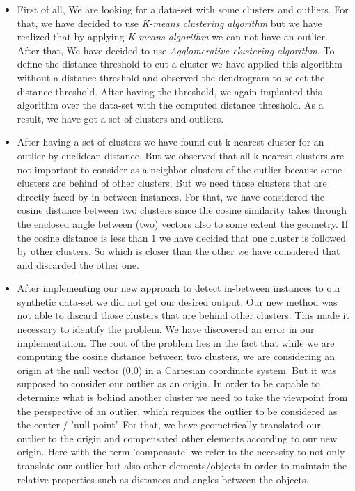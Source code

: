\documentclass[11pt]{article}
\theoremstyle{definition}
\begin{document}
\begin{itemize}
    \item First of all, We are looking for a data-set with some clusters and outliers. For that, we have decided to use \textit{K-means clustering algorithm} but we have realized that by applying \textit{K-means algorithm} we can not have an outlier. After that, We have decided to use \textit{Agglomerative clustering algorithm}. To define the distance threshold to cut a cluster we have applied this algorithm without a distance threshold and observed the dendrogram to select the distance threshold. After having the threshold, we again implanted this algorithm over the data-set with the computed distance threshold. As a result, we have got a set of clusters and outliers.
    
    \item After having a set of clusters we have found out k-nearest cluster for an outlier by euclidean distance. But we observed that all k-nearest clusters are not important to consider as a neighbor clusters of the outlier because some clusters are behind of other clusters. But we need those clusters that are directly faced by in-between instances. For that, we have considered the cosine distance between two clusters since the cosine similarity takes through the enclosed angle between (two) vectors also to some extent the geometry. If the cosine distance is less than 1 we have decided that one cluster is followed by other clusters. So which is closer than the other we have considered that and discarded the other one.

    \item After implementing our new approach to detect in-between instances to our synthetic data-set we did not get our desired output. Our new method was not able to discard those clusters that are behind other clusters. This made it necessary to identify the problem. We have discovered an error in our implementation.
    The root of the problem lies in the fact that while we are computing the cosine distance between two clusters, we are considering an origin at the null vector (0,0) in a Cartesian coordinate system. But it was supposed to consider our outlier as an origin. In order to be capable to determine what is behind another cluster we need to take the viewpoint from the perspective of an outlier, which requires the outlier to be considered as the center  / 'null point'. For that, we have geometrically translated our outlier to the origin and compensated other elements according to our new origin. Here with the term 'compensate' we refer to the necessity to not only translate our outlier but also other elements/objects in order to maintain the relative properties such as distances and angles between the objects.
    

\end{itemize}
\end{document}
